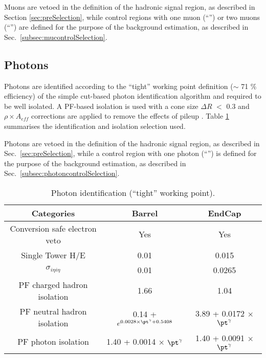 Muons are vetoed in the definition of the hadronic signal region, 
as described in Section \ref{sec:preSelection}, while 
control regions with one muon (``\mj'') or two muons (``\mmj'') are defined for the purpose of the background estimation, 
as described in Sec.~\ref{subsec:mucontrolSelection}.


\subsection{Photons}
\label{sec:photon-id}
Photons are identified according to the ``tight'' working point definition ($\sim$ 71 $\%$ efficiency) 
of the simple cut-based photon identification algorithm \cite{photon-id} 
and required to be well isolated. 
A PF-based isolation is used with a cone size $\Delta R$ $<$ 0.3 and
$\rho\times A_{eff}$ corrections are applied to remove the effects of pileup \cite{pf-photon}. 
Table \ref{tab:photon-id-gamma} summarises the identification and isolation selection used. 

Photons are vetoed in the definition of the hadronic signal region, 
as described in Sec.~\ref{sec:preSelection}, while a 
control region with one photon (``\gj'') is defined for the purpose of the background estimation, 
as described in Sec.~\ref{subsec:photoncontrolSelection}.


\begin{table}[ht!]
  \caption{Photon identification (``tight'' working point).\label{tab:photon-id-gamma}}
  \centering
  \footnotesize
  \begin{tabular}{ ccc }
    \hline
    \hline
    Categories                    & Barrel                             & EndCap                             \\
    \hline
    Conversion safe electron veto & Yes                                & Yes                                \\
    Single Tower H/E              & 0.01                               & 0.015                               \\
    $\sigma_{i\eta i\eta}$        & 0.01                               & 0.0265                               \\
    PF charged hadron isolation   & 1.66                               & 1.04                               \\
    PF neutral hadron isolation   & 0.14 + $ e^{0.0028 \times \pt^{\gamma} + 0.5408}$  &  3.89 + 0.0172 $\times$ $\pt^{\gamma}$\\
    PF photon isolation           & 1.40 + 0.0014 $\times$ $\pt^{\gamma}$ & 1.40 + 0.0091 $\times$ $\pt^{\gamma}$ \\
    \hline
    \hline
  \end{tabular}
  \end{table}


